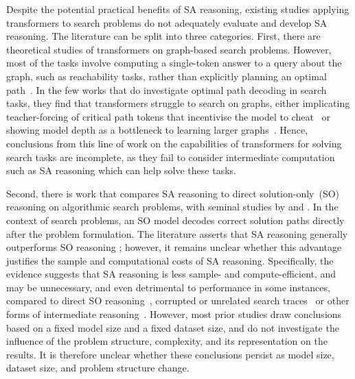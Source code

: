 Despite the potential practical benefits of SA reasoning, existing studies applying transformers to search problems do not adequately evaluate and develop SA reasoning.
The literature can be split into three categories.
First, there are theoretical studies of transformers on graph-based search problems.
However, most of the tasks involve computing a single-token answer to a query about the graph, such as reachability tasks, rather than explicitly planning an optimal path~\citep{sanfordUnderstandingTransformerReasoning2024,abbeHowFarCan2024}.
In the few works that do investigate optimal path decoding in search tasks, they find that transformers struggle to search on graphs, either implicating teacher-forcing of critical path tokens that incentivise the model to cheat~\citep{bachmannPitfallsNexttokenPrediction2025} or showing model depth as a bottleneck to learning larger graphs~\citep{saparovTransformersStruggleLearn2025}.
Hence, conclusions from this line of work on the capabilities of transformers for solving search tasks are incomplete, as they fail to consider intermediate computation such as SA reasoning which can help solve these tasks.

Second, there is work that compares SA reasoning to direct solution-only~(SO) reasoning on algorithmic search problems, with seminal studies by \citet{lehnertBetterPlanningTransformers2024} and \citet{gandhiStreamSearchSoS2024}.
In the context of search problems, an SO model decodes correct solution paths directly after the problem formulation.
The literature asserts that SA reasoning generally outperforms SO reasoning \citep{gandhiStreamSearchSoS2024,lehnertBetterPlanningTransformers2024,valmeekamSemanticsUnreasonableEffectiveness2025,qinBacktrackNotBacktrack2025,kangLinTreeImprovingLLM2026,suDualformerControllableFast2025}; however, it remains unclear whether this advantage justifies the sample and computational costs of SA reasoning.
Specifically, the evidence suggests that SA reasoning is less sample- and compute-efficient, and may be unnecessary, and even detrimental to performance in some instances, compared to direct SO reasoning~\citep{qinBacktrackNotBacktrack2025,lehnertBetterPlanningTransformers2024}, corrupted or unrelated search traces~\citep{valmeekamSemanticsUnreasonableEffectiveness2025,suDualformerControllableFast2025} or other forms of intermediate reasoning~\citep{haoTrainingLargeLanguage2025}.
However, most prior studies draw conclusions based on a fixed model size and a fixed dataset size, and do not investigate the influence of the problem structure, complexity, and its representation on the results.
It is therefore unclear whether these conclusions persist as model size, dataset size, and problem structure change.

